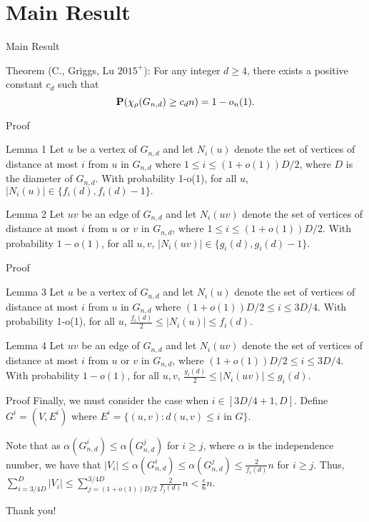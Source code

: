 \documentclass{beamer}
\begin{document}
\section{Main Result}

\begin{frame}{Main Result}
\begin{block}{Theorem (C., Griggs, Lu $2015^+$):}
For any integer $d\geq 4$, there exists a positive constant $c_d$ such that $${\bf{P}}(\chi_\rho(G_{n,d})\geq c_dn)=1-o_n(1).$$
\end{block}
\end{frame}


\begin{frame}{Proof}
\begin{block}{Lemma 1}
Let $u$ be a vertex of $G_{n,d}$ and let $N_i(u)$ denote the set of vertices of distance at most $i$ from $u$ in $G_{n,d}$ where $1\leq i\leq (1+o(1))D/2$, where $D$ is the diameter of $G_{n,d}$.  With probability 1-o(1), for all $u$, $\vert N_i(u)\vert\in\{f_i(d),f_i(d)-1\}.$
\end{block}

\begin{block}{Lemma 2}
Let $uv$ be an edge of $G_{n,d}$ and let $N_i(uv)$ denote the set of vertices of distance at most $i$ from $u$ or $v$ in $G_{n,d}$, where $1\leq i\leq (1+o(1))D/2$.  With probability $1-o(1)$, for all $u,v$, $\vert N_i(uv)\vert\in\{g_i(d),g_i(d)-1\}$.
\end{block}
\end{frame}

\begin{frame}{Proof}
\begin{block}{Lemma 3}
Let $u$ be a vertex of $G_{n,d}$ and let $N_i(u)$ denote the set of vertices of distance at most $i$ from $u$ in $G_{n,d}$ where $(1+o(1))D/2\leq i\leq 3D/4$.  With probability 1-o(1), for all $u$, $\frac{f_i(d)}{2}\leq\vert N_i(u)\vert\leq f_i(d).$
\end{block}
\begin{block}{Lemma 4}
Let $uv$ be an edge of $G_{n,d}$ and let $N_i(uv)$ denote the set of vertices of distance at most $i$ from $u$ or $v$ in $G_{n,d}$, where $(1+o(1))D/2\leq i\leq 3D/4$.  With probability $1-o(1)$, for all $u,v$, $\frac{g_i(d)}{2}\leq\vert N_i(uv)\vert\leq g_i(d)$.
\end{block}
\end{frame}

\begin{frame}{Proof}
Finally, we must consider the case when $i\in[3D/4+1, D]$.  Define $G^i=(V,E^i)$ where $E^i=\{(u,v): d(u,v)\leq i{\text{  in  }}G\}$.

Note that as $\alpha(G_{n,d}^i)\leq\alpha(G_{n,d}^j)$ for $i\geq j$, where $\alpha$ is the independence number, we have that $\vert V_i\vert\leq\alpha(G_{n,d}^{i})\leq\alpha(G_{n,d}^j)\leq\frac{2}{f_i(d)}n$ for $i\geq j$.  Thus, $\sum_{i=3/4D}^{D}\vert V_i\vert\leq\sum_{j=(1+o(1))D/2}^{3/4D}\frac{2}{f_j(d)}n<\frac{\epsilon}{6}n.$
\end{frame}

\begin{frame}
\begin{center}
Thank you!
\end{center}
\end{frame}
\end{document}
